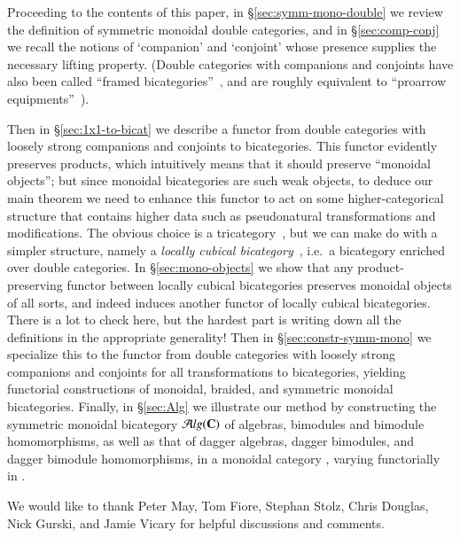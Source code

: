 Proceeding to the contents of this paper, in
\S\ref{sec:symm-mono-double} we review the definition of symmetric
monoidal double categories, and in \S\ref{sec:comp-conj} we recall the
notions of `companion' and `conjoint' whose presence supplies the
necessary lifting property.
(Double categories with companions and conjoints have also been called ``framed bicategories''~\cite{shulman:frbi}, and are roughly equivalent to ``proarrow equipments''~\cite{wood:proarrows-i}).

Then in \S\ref{sec:1x1-to-bicat} we describe a functor from double
categories with loosely strong companions and conjoints to bicategories.  This functor evidently preserves products, which intuitively means that it should preserve ``monoidal objects''; but since monoidal bicategories are such weak objects, to deduce our main theorem we need to enhance this functor to act on some higher-categorical structure that contains higher data such as pseudonatural transformations and modifications.
The obvious choice is a tricategory~\cite{gps:tricats}, but we can make do with a simpler structure, namely a \emph{locally cubical bicategory}~\cite{gg:ldstr-tricat}, i.e.\ a bicategory enriched over double categories.
In \S\ref{sec:mono-objects} we show that any product-preserving functor between locally cubical bicategories preserves monoidal objects of all sorts, and indeed induces another functor of locally cubical bicategories.
There is a lot to check here, but the hardest part is writing down all the definitions in the appropriate generality!
Then in \S\ref{sec:constr-symm-mono} we specialize this to the functor from double categories with loosely strong companions and conjoints for all transformations to bicategories, yielding functorial constructions of monoidal, braided, and symmetric monoidal bicategories.
Finally, in \S\ref{sec:Alg} we illustrate our method by constructing the symmetric monoidal bicategory ${\mathcal{A}}lg(\mathbf{C})$ of algebras, bimodules and bimodule homomorphisms, as well as that of dagger algebras, dagger bimodules, and dagger bimodule homomorphisms, in a monoidal category \bC, varying functorially in \bC.

We would like to thank Peter May, Tom Fiore, Stephan Stolz, Chris
Douglas, Nick Gurski, and Jamie Vicary for helpful discussions and comments.


